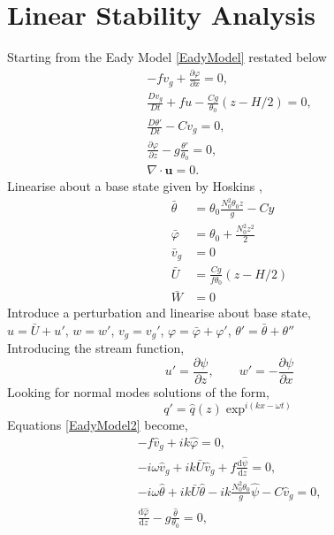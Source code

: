 \section{Linear Stability Analysis}
Starting from the Eady Model \ref{EadyModel} restated below
\begin{equation}
\begin{aligned}
-fv_g + \frac{\partial \varphi}{\partial x} = 0,\\
\frac{Dv_g}{Dt} + fu -\frac{Cg}{\theta _0}\left(z-H/2\right) = 0,\\
\frac{D\theta'}{Dt} - Cv_g = 0,\\
\frac{\partial \varphi}{\partial z} - g\frac{\theta'}{\theta_0} = 0,\\
\nabla \cdot \bm{u} = 0.
\end{aligned}
\label{EadyModel2}
\end{equation} 
Linearise about a base state given by Hoskins \cite{Hoskins1975},
\begin{equation}
\begin{aligned}
\bar{\theta} &= \theta_0 \frac{N_0^2\theta_0 z}{g} - Cy \\
\bar{\varphi} &= \theta_0 + \frac{N_0^2 z^2}{2}\\
\bar{v}_g &= 0\\
\bar{U} &= \frac{Cg}{f\theta_0}\left(z - H/2\right)\\
\bar{W} &= 0 
\end{aligned}
\end{equation}
Introduce a perturbation and linearise about base state,\\
$u = \bar{U} + u'$, $w = w'$, $v_g =  v_g'$, $\varphi = \bar{\varphi} + \varphi'$, $\theta ' = \bar{\theta} + \theta ''$\\
Introducing the stream function,
\begin{equation}
u' = \frac{\partial \psi}{\partial z},\qquad w' = -\frac{\partial \psi}{\partial x} 
\end{equation}
Looking for normal modes solutions of the form,
\begin{equation*}
q' = \hat{q}(z)\exp^{i \left(kx - \omega t\right)}
\end{equation*}
Equations \ref{EadyModel2} become,
\begin{align}
-f\hat{v}_g + ik\hat{\varphi} = 0,\label{stab1}\\
-i\omega \hat{v}_g + ik\bar{U}\hat{v}_g + f\frac{\text{d}\hat{\psi}}{\text{d}z} = 0,\label{stab2}\\
-i \omega \hat{\theta} + i k \bar{U} \hat{\theta} - ik\frac{N_0^2\theta_0}{g} \hat{\psi} - C\hat{v}_g = 0,\label{stab3}\\
\frac{\text{d}\hat{\varphi}}{\text{d}z} - g\frac{\hat{\theta}}{\theta_0} = 0 \label{stab4},
\end{align}
